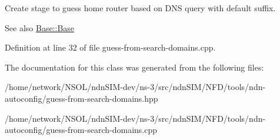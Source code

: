 Create stage to guess home router based on D\+NS query with default suffix. 

\begin{DoxySeeAlso}{See also}
\hyperlink{classndn_1_1tools_1_1autoconfig_1_1Base_a4d378253464c3fde9a499ccafb944153}{Base\+::\+Base} 
\end{DoxySeeAlso}


Definition at line 32 of file guess-\/from-\/search-\/domains.\+cpp.



The documentation for this class was generated from the following files\+:\begin{DoxyCompactItemize}
\item 
/home/network/\+N\+S\+O\+L/ndn\+S\+I\+M-\/dev/ns-\/3/src/ndn\+S\+I\+M/\+N\+F\+D/tools/ndn-\/autoconfig/guess-\/from-\/search-\/domains.\+hpp\item 
/home/network/\+N\+S\+O\+L/ndn\+S\+I\+M-\/dev/ns-\/3/src/ndn\+S\+I\+M/\+N\+F\+D/tools/ndn-\/autoconfig/guess-\/from-\/search-\/domains.\+cpp\end{DoxyCompactItemize}
